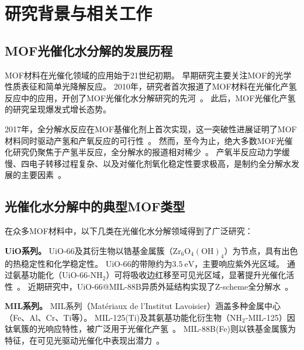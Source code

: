 \section{研究背景与相关工作}\label{sec:related-work}


\subsection{MOF光催化水分解的发展历程}

MOF材料在光催化领域的应用始于21世纪初期。
早期研究主要关注MOF的光学性质表征和简单光降解反应。 %
2010年，研究者首次报道了MOF材料在光催化产氢反应中的应用，开创了MOF光催化水分解研究的先河~\citep{chen2023mof_owsp_review}。 %
此后，MOF光催化产氢的研究呈现爆发式增长态势。

2017年，全分解水反应在MOF基催化剂上首次实现，这一突破性进展证明了MOF材料同时驱动产氢和产氧反应的可行性~\citep{chen2023mof_owsp_review}。 %
然而，至今为止，绝大多数MOF光催化研究仍聚焦于产氢半反应，全分解水的报道相对稀少~\citep{chen2023mof_owsp_review,mof_on_mof_owsp}。 %
产氧半反应动力学缓慢、四电子转移过程复杂、以及对催化剂氧化稳定性要求极高，是制约全分解水发展的主要因素~\citep{mof_on_mof_owsp}。 %


\subsection{光催化水分解中的典型MOF类型}

在众多MOF材料中，以下几类在光催化水分解领域得到了广泛研究：

\textbf{UiO系列。}
UiO-66及其衍生物以锆基金属簇（$\mathrm{Zr_6O_4(OH)_4}$）为节点，具有出色的热稳定性和化学稳定性。 %
UiO-66的带隙约为$3.5~\mathrm{eV}$，主要响应紫外光区域。
通过氨基功能化（UiO-66-NH$_2$）可将吸收边红移至可见光区域，显著提升光催化活性~\citep{li2024mof_composites_h2}。 %
近期研究中，UiO-66@MIL-88B异质外延结构实现了Z-scheme全分解水~\citep{uio66_mil88b_2024}。 %

\textbf{MIL系列。}
MIL系列（Mat\'{e}riaux de l'Institut Lavoisier）涵盖多种金属中心（Fe、Al、Cr、Ti等）。
MIL-125(Ti)及其氨基功能化衍生物（NH$_2$-MIL-125）因钛氧簇的光响应特性，被广泛用于光催化产氢~\citep{hassan2024emerging_trends}。 %
MIL-88B(Fe)则以铁基金属簇为特征，在可见光驱动光催化中表现出潜力~\citep{uio66_mil88b_2024}。 %

